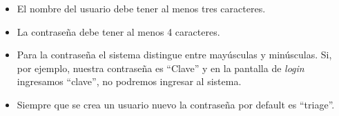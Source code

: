 \begin{itemize}
\item El nombre del usuario debe tener al menos tres caracteres.
\item La contraseña debe tener al menos 4 caracteres.
\item Para la contraseña el sistema distingue entre mayúsculas y minúsculas. Si, por ejemplo, nuestra contraseña es ``Clave'' y en la pantalla de \textit{login} ingresamos ``clave'', no podremos ingresar al sistema.
\item Siempre que se crea un usuario nuevo la contraseña por default es ``triage''.
\end{itemize}